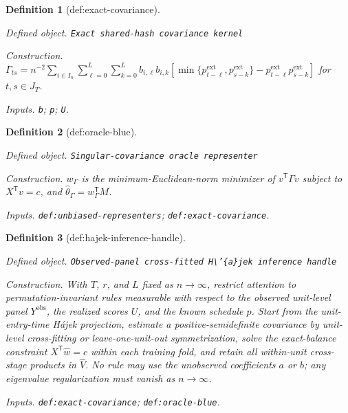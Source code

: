 \documentclass{article}
\newtheorem{definition}{Definition}
\begin{document}
\begin{definition}[def:exact-covariance]\label{def:exact-covariance}
\par\smallskip\noindent\emph{Defined object.} \texttt{Exact shared-\allowbreak{}hash covariance kernel}
\par\smallskip\noindent\emph{Construction.} \(\Gamma_{ts}=n^{-2}\sum_{i\in I_n}\sum_{\ell=0}^{L}\sum_{k=0}^{L}b_{i,\ell}b_{i,k}[\min\{p^{\mathrm{ext}}_{t-\ell},p^{\mathrm{ext}}_{s-k}\}-p^{\mathrm{ext}}_{t-\ell}p^{\mathrm{ext}}_{s-k}]\) for \(t,s\in J_T\).
\par\smallskip\noindent\emph{Inputs.} \texttt{b}; \texttt{p}; \texttt{U}.
\end{definition}

\begin{definition}[def:oracle-blue]\label{def:oracle-blue}
\par\smallskip\noindent\emph{Defined object.} \texttt{Singular-\allowbreak{}covariance oracle representer}
\par\smallskip\noindent\emph{Construction.} \(w_\Gamma\) is the minimum-Euclidean-norm minimizer of \(v^{\mathsf T}\Gamma v\) subject to \(X^{\mathsf T}v=c\), and \(\widehat\theta_\Gamma=w_\Gamma^{\mathsf T}M\).
\par\smallskip\noindent\emph{Inputs.} \texttt{def:\allowbreak{}unbiased-\allowbreak{}representers}; \texttt{def:\allowbreak{}exact-\allowbreak{}covariance}.
\end{definition}

\begin{definition}[def:hajek-inference-handle]\label{def:hajek-inference-handle}
\par\smallskip\noindent\emph{Defined object.} \texttt{Observed-\allowbreak{}panel cross-\allowbreak{}fitted H\textbackslash{}\allowbreak{}'\{a\}\allowbreak{}jek inference handle}
\par\smallskip\noindent\emph{Construction.} With \(T\), \(r\), and \(L\) fixed as \(n\to\infty\), restrict attention to permutation-invariant rules measurable with respect to the observed unit-level panel \(Y^{\mathrm{obs}}\), the realized scores \(U\), and the known schedule \(p\). Start from the unit-entry-time H\'{a}jek projection, estimate a positive-semidefinite covariance by unit-level cross-fitting or leave-one-unit-out symmetrization, solve the exact-balance constraint \(X^{\mathsf T}\widehat w=c\) within each training fold, and retain all within-unit cross-stage products in \(\widehat V\). No rule may use the unobserved coefficients \(a\) or \(b\); any eigenvalue regularization must vanish as \(n\to\infty\).
\par\smallskip\noindent\emph{Inputs.} \texttt{def:\allowbreak{}exact-\allowbreak{}covariance}; \texttt{def:\allowbreak{}oracle-\allowbreak{}blue}.
\end{definition}
\end{document}
